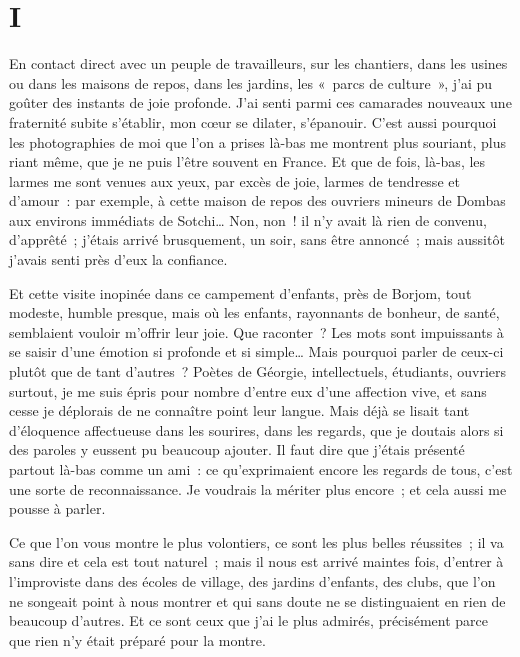 \documentclass[french,twoside]{book} %
\newcommand{\astermono}{\medskip\centerline{\color{rubric}\large\selectfont{\syms ✻}}\medskip\par}%
\newcommand\chapteropen{} %
\newcommand\chaptercont{} %
\begin{document}
\chapteropen

\chapter[{I}]{I}
\renewcommand{\leftmark}{I}


\chaptercont
\noindent En contact direct avec un peuple de travailleurs, sur les chantiers, dans les usines ou dans les maisons de repos, dans les jardins, les « parcs de culture », j’ai pu goûter des instants de joie profonde. J’ai senti parmi ces camarades nouveaux une fraternité subite s’établir, mon cœur se dilater, s’épanouir. C’est aussi pourquoi les photographies de moi que l’on a prises là-bas me montrent plus souriant, plus riant même, que je ne puis l’être souvent en France. Et que de fois, là-bas, les larmes me sont venues aux yeux, par excès de joie, larmes de tendresse et d’amour : par exemple, à cette maison de repos des ouvriers mineurs de Dombas aux environs immédiats de Sotchi… Non, non ! il n’y avait là rien de convenu, d’apprêté ; j’étais arrivé brusquement, un soir, sans être annoncé ; mais aussitôt j’avais senti près d’eux la confiance.\par
Et cette visite inopinée dans ce campement d’enfants, près de Borjom, tout modeste, humble presque, mais où les enfants, rayonnants de bonheur, de santé, semblaient vouloir m’offrir leur joie. Que raconter ? Les mots sont impuissants à se saisir d’une émotion si profonde et si simple… Mais pourquoi parler de ceux-ci plutôt que de tant d’autres ? Poètes de Géorgie, intellectuels, étudiants, ouvriers surtout, je me suis épris pour nombre d’entre eux d’une affection vive, et sans cesse je déplorais de ne connaître point leur langue. Mais déjà se lisait tant d’éloquence affectueuse dans les sourires, dans les regards, que je doutais alors si des paroles y eussent pu beaucoup ajouter. Il faut dire que j’étais présenté partout là-bas comme un ami : ce qu’exprimaient encore les regards de tous, c’est une sorte de reconnaissance. Je voudrais la mériter plus encore ; et cela aussi me pousse à parler.\par

\astermono

\noindent Ce que l’on vous montre le plus volontiers, ce sont les plus belles réussites ; il va sans dire et cela est tout naturel ; mais il nous est arrivé maintes fois, d’entrer à l’improviste dans des écoles de village, des jardins d’enfants, des clubs, que l’on ne songeait point à nous montrer et qui sans doute ne se distinguaient en rien de beaucoup d’autres. Et ce sont ceux que j’ai le plus admirés, précisément parce que rien n’y était préparé pour la montre.\par
\end{document}
